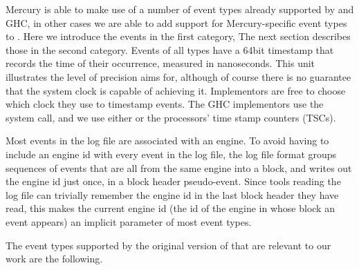 Mercury is able to make use of a number of event types already supported by
\tscope and GHC,
in other cases we are able to add support for Mercury-specific event types to
\tscope.
Here we introduce the events in the first category,
The next section describes those in the second category.
Events of all types have a 64bit timestamp
that records the time of their occurrence, measured in nanoseconds.
This unit illustrates the level of precision \tscope aims for,
although of course there is no guarantee
that the system clock is capable of achieving it.
Implementors are free to choose which clock they use to timestamp events.
The GHC implementors use the  system call,
and we use either  or the processors' time stamp
counters (TSCs).

Most events in the log file are associated with an engine.
To avoid having to include an engine id with every event in the log file,
the log file format
groups sequences of events that are all from the same engine into a block,
and writes out the engine id just once, in a block header pseudo-event.
Since tools reading the log file can trivially remember
the engine id in the last block header they have read,
this makes the current engine id
(the id of the engine in whose block an event appears)
an implicit parameter of most event types.

The event types supported by the original version of \tscope
that are relevant to our work are the following.

